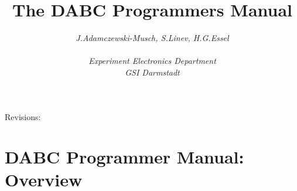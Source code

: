 \documentclass{dabcclass}
\begin{document}
\title{ \huge \bf  The DABC Programmers Manual\\} 
\author{\em J.Adamczewski-Musch, S.Linev, H.G.Essel \\ \\ Experiment Electronics Department \\
GSI Darmstadt} 
\maketitle 

\thispagestyle{empty} 
{\huge Revisions:}

\clearpage

\thispagestyle{empty} \tableofcontents
\thispagestyle{empty} \cleardoublepage
\chapter{DABC Programmer Manual: Overview}
 \cleardoublepage

%
\end{document}
